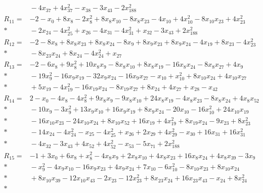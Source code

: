 \documentclass[11pt]{article}
\theoremstyle{remark}\newtheorem{remark}[theorem]{Remark}
\begin{document}
\begin{align*}
&{} - 4x_{37} + 4x_{37}^{2} - x_{38} - 3x_{43} - 2x_{188}^{2} \\[4pt]
R_{11} ={}& -2 - x_{0} + 8x_{8} - 2x_{8}^{2} + 8x_{8}x_{10} - 8x_{8}x_{23} - 4x_{10} + 4x_{10}^{2} - 8x_{10}x_{23} + 4x_{23}^{2} \\*
&{} - 2x_{24} - 4x_{25}^{2} + x_{26} - 4x_{31} - 4x_{31}^{2} + x_{32} - 3x_{43} + 2x_{188}^{2} \\[4pt]
R_{12} ={}& -2 - 8x_{8} + 8x_{8}x_{23} + 8x_{8}x_{24} - 8x_{9} + 8x_{9}x_{23} + 8x_{9}x_{24} - 4x_{19} + 8x_{23} - 4x_{23}^{2} \\*
&{} - 8x_{23}x_{24} + 8x_{24} - 4x_{24}^{2} + x_{27} \\[4pt]
R_{13} ={}& -2 - 6x_{8} + 9x_{8}^{2} + 10x_{8}x_{9} - 8x_{8}x_{10} + 8x_{8}x_{19} - 16x_{8}x_{24} - 8x_{8}x_{27} + 4x_{9} \\*
&{} - 19x_{9}^{2} - 16x_{9}x_{19} - 32x_{9}x_{24} - 16x_{9}x_{27} - x_{10} + x_{10}^{2} + 8x_{10}x_{24} + 4x_{10}x_{27} \\*
&{} + 5x_{19} - 4x_{19}^{2} - 16x_{19}x_{24} - 8x_{19}x_{27} + 8x_{24} + 4x_{27} + x_{28} - x_{42} \\[4pt]
R_{14} ={}& 2 - x_{0} - 4x_{8} - 4x_{8}^{2} + 9x_{8}x_{9} - 9x_{8}x_{10} + 24x_{8}x_{19} - 4x_{8}x_{23} - 8x_{8}x_{24} + 4x_{8}x_{52} \\*
&{} - 10x_{9} - 3x_{9}^{2} + 13x_{9}x_{10} + 16x_{9}x_{19} + 8x_{9}x_{24} - 20x_{10} - 16x_{10}^{2} + 24x_{10}x_{19} \\*
&{} - 16x_{10}x_{23} - 24x_{10}x_{24} + 8x_{10}x_{52} + 16x_{19} + 4x_{19}^{2} + 8x_{19}x_{24} - 9x_{23} + 8x_{23}^{2} \\*
&{} - 14x_{24} - 4x_{24}^{2} - x_{25} - 4x_{25}^{2} + x_{26} + 2x_{29} + 4x_{29}^{2} - x_{30} + 16x_{31} + 16x_{31}^{2} \\*
&{} - 4x_{32} - 3x_{43} + 4x_{52} + 4x_{52}^{2} - x_{53} - 5x_{71} + 2x_{188}^{2} \\[4pt]
R_{15} ={}& -1 + 3x_{0} + 6x_{8} + x_{8}^{2} - 4x_{8}x_{9} + 2x_{8}x_{10} + 4x_{8}x_{23} + 16x_{8}x_{24} + 4x_{8}x_{39} - 3x_{9} \\*
&{} - x_{9}^{2} - 4x_{9}x_{10} - 16x_{9}x_{23} + 4x_{9}x_{24} + 7x_{10} - 6x_{10}^{2} - 8x_{10}x_{23} + 8x_{10}x_{24} \\*
&{} + 8x_{10}x_{39} - 12x_{10}x_{43} - 2x_{23} - 12x_{23}^{2} + 8x_{23}x_{24} + 16x_{23}x_{43} - x_{24} + 8x_{24}^{2} \\*

\end{align*}
\end{document}

